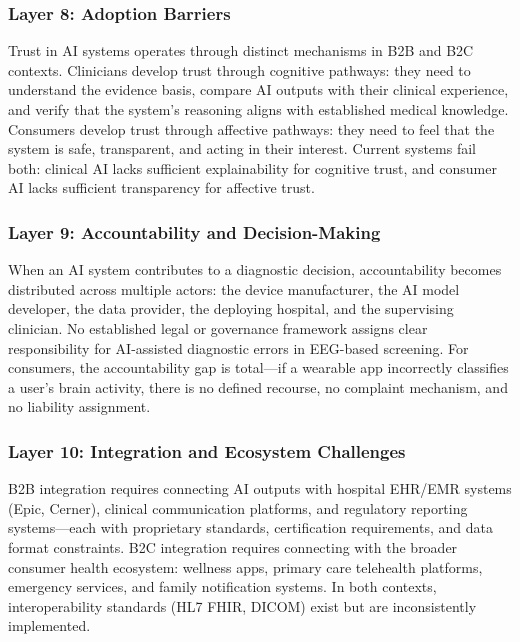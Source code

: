 \subsubsection{Layer 8: Adoption Barriers}

Trust in AI systems operates through distinct mechanisms in B2B and B2C contexts. Clinicians develop trust through cognitive pathways: they need to understand the evidence basis, compare AI outputs with their clinical experience, and verify that the system's reasoning aligns with established medical knowledge. Consumers develop trust through affective pathways: they need to feel that the system is safe, transparent, and acting in their interest. Current systems fail both: clinical AI lacks sufficient explainability for cognitive trust, and consumer AI lacks sufficient transparency for affective trust.

\subsubsection{Layer 9: Accountability and Decision-Making}

When an AI system contributes to a diagnostic decision, accountability becomes distributed across multiple actors: the device manufacturer, the AI model developer, the data provider, the deploying hospital, and the supervising clinician. No established legal or governance framework assigns clear responsibility for AI-assisted diagnostic errors in EEG-based screening. For consumers, the accountability gap is total---if a wearable app incorrectly classifies a user's brain activity, there is no defined recourse, no complaint mechanism, and no liability assignment.

\subsubsection{Layer 10: Integration and Ecosystem Challenges}

B2B integration requires connecting AI outputs with hospital EHR/EMR systems (Epic, Cerner), clinical communication platforms, and regulatory reporting systems---each with proprietary standards, certification requirements, and data format constraints. B2C integration requires connecting with the broader consumer health ecosystem: wellness apps, primary care telehealth platforms, emergency services, and family notification systems. In both contexts, interoperability standards (HL7 FHIR, DICOM) exist but are inconsistently implemented.

